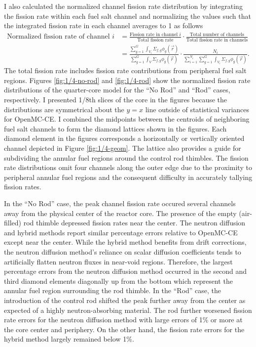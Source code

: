 I also calculated the normalized channel fission rate distribution by integrating the fission rate
within each fuel salt channel and normalizing the values such that the integrated fission rate in
each channel averages to 1 as follows
%
\begin{align}
  \text{Normalized fission rate of channel }i &= \frac{\text{Fission rate in channel }i}{
  \text{Total fission rate}}\cdot\frac{\text{Total number of channels}}{
    \text{Total fission rate in channels}} \nonumber \\
                                              &= \frac{\sum^G_{g=1}\int_{V_i}\Sigma_{f,g}
  \phi_g(\vec{r})}{\sum^G_{g=1}\int_V\Sigma_{f,g}\phi_g(\vec{r})}\cdot\frac{N_i}{
  \sum^{N_i}_{i=1}\sum^G_{g=1}\int_{V_i}\Sigma_{f,g}\phi_g(\vec{r})}.
\end{align}
%
The total fission rate includes fission rate contributions from peripheral fuel salt regions.
Figures \ref{fig:1/4-no-rod} and \ref{fig:1/4-rod} show the normalized fission rate distributions
of the quarter-core model for the ``No Rod'' and ``Rod'' cases, respectively. I presented 1/8th
slices of the core in the figures because the distributions are symmetrical about the $y=x$ line
outside of statistical variances for OpenMC-CE. I combined the midpoints between the centroids of
neighboring fuel salt channels to form the diamond lattices shown in the figures.
Each diamond element in the figures corresponds a horizontally or vertically oriented channel
depicted in Figure \ref{fig:1/4-geom}. The lattice also provides a guide for subdividing the
annular fuel regions around the control rod thimbles. The fission rate
distributions omit four channels along the outer edge due to the proximity to peripheral annular
fuel regions and the consequent difficulty in accurately tallying fission rates.

In the ``No Rod'' case, the peak channel fission rate occured several channels away from the
physical center of the reactor core. The presence of the empty (air-filled) rod thimble depressed
fission rates near the center. The neutron diffusion and hybrid methods report similar percentage
errors relative to OpenMC-CE except near the center. While the hybrid method benefits from drift
corrections, the neutron diffusion method's reliance on scalar diffusion coefficients tends to
artificially flatten neutron fluxes in near-void regions. Therefore, the largest percentage errors
from the neutron diffusion method occurred in the second and third diamond elements
diagonally up from the bottom which represent the annular fuel region surrounding the rod thimble.
In the ``Rod'' case, the introduction of the control rod shifted the peak further away from the
center as expected of a highly neutron-absorbing material. The rod further worsened fission rate
errors for the neutron diffusion method with large errors of 1\% or more at the core center and
periphery. On the other hand, the fission rate errors for the hybrid method largely remained below
1\%.

